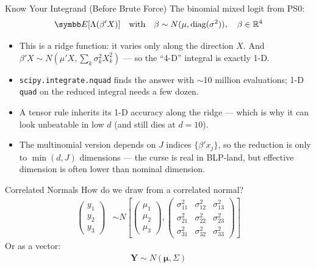 \documentclass[aspectratio=169,11pt]{beamer}
\begin{document}
\begin{frame}{Know Your Integrand (Before Brute Force)}
The binomial mixed logit from PS0:
\begin{align*}
\E[\Lambda(\beta'X)] \quad \text{with} \quad \beta \sim N(\mu, \text{diag}(\sigma^2)), \quad \beta \in \mathbb{R}^4
\end{align*}
\begin{itemize}
\item This is a \alert{ridge function}: it varies only along the direction $X$. And $\beta'X \sim N\left(\mu'X, \sum_k \sigma_k^2 X_k^2\right)$ --- so the ``4-D'' integral is \alert{exactly 1-D}.
\item \texttt{scipy.integrate.nquad} finds the answer with $\sim$10 million evaluations; 1-D \texttt{quad} on the reduced integral needs a few dozen.
\item A tensor rule inherits its 1-D accuracy along the ridge --- which is why it can look unbeatable in low $d$ (and still dies at $d=10$).
\item The multinomial version depends on $J$ indices $\{\beta'x_j\}$, so the reduction is only to $\min(d, J)$ dimensions --- the curse is real in BLP-land, but \alert{effective dimension} is often lower than nominal dimension.
\end{itemize}
\end{frame}



\begin{frame}{Correlated Normals}
How do we draw from a correlated normal?
\begin{align*}
\begin{pmatrix}
y_{1}\\
y_{2}\\
y_{3}
\end{pmatrix} & \sim 
N\left[\left(\begin{array}{c}
\mu_1 \\
\mu_2\\
\mu_3
\end{array}\right),\left(\begin{array}{ccc}
\sigma_{11}^2 & \sigma_{12}^2& \sigma_{13}^2\\
\sigma_{21}^2 & \sigma_{22}^2 & \sigma_{23}^2\\
\sigma_{31}^2 & \sigma_{32}^2 & \sigma_{33}^2
\end{array}\right)\right]
\end{align*}
Or as a vector:
\begin{align*}
\symbf{Y} \sim N(\symbf{\mu},\Sigma)
\end{align*}
\end{frame}
\end{document}
